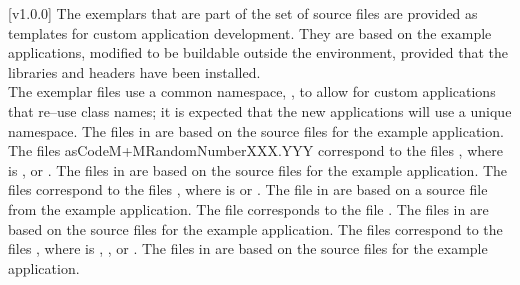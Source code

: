 [v1.0.0]
%
The exemplars that are part of the \mplusm{} set of source files are
provided as templates for custom application development.
They are based on the example applications, modified to be buildable outside the \mplusm{}
environment, provided that the \mplusm{} libraries and headers have been installed.\\

The exemplar files use a common namespace, , to allow for custom
applications that re--use class names; it is expected that the new applications will use
a unique namespace.
The files in  are based on the source files for the
 example application.
The files asCode{M+MRandomNumberXXX.YYY} correspond to the files
, where  is ,
 or .
The files in  are based on the source files for the
 example application.
The files  correspond to the files
, where  is  or .
The file in  are based on a source file from the
 example application.
The file  corresponds to the file
.
The files in  are based on the source files for the
 example application.
The files  correspond to the files
, where  is ,
,  or .
The files in  are based on the source files for the
 example application.

